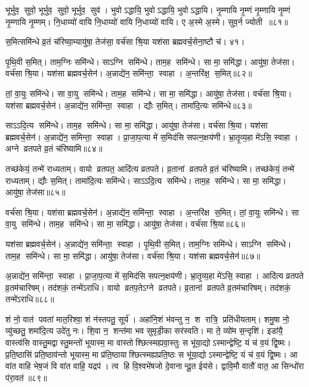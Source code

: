 भूर्भुव॒ सुवो॒ भूर्भुव॒ सुवो॒ भूर्भुव॒ सुव॑। भुवोऽद्धायि॒ भुवोऽद्धायि॒ भुवोऽद्धायि। नृ॒म्णायि नृ॒म्णं नृ॒म्णायि नृ॒म्णं नृ॒म्णायि नृ॒म्णम्। नि॒धाय्यो॑ वायि नि॒धाय्यो॑ वायि नि॒धाय्यो॑ वायि। ए अ॒स्मे अ॒स्मे। सुव॒र्न ज्योती॥८१॥

स॒मित्समि॑न्धे व्र॒तं च॑रिष्या॒म्यायु॑षा॒ तेज॑सा॒ वर्च॑सा श्रि॒या यश॑सा ब्रह्मवर्च॒सेना॒ष्टौ च॑। ४१।
\anuvakamend


पृ॒थि॒वी स॒मित्। ताम॒ग्निः समि॑न्धे। साऽग्नि समि॑न्धे। ताम॒ह समि॑न्धे। सा मा॒ समि॑द्धा। आयु॑षा॒ तेज॑सा। वर्च॑सा श्रि॒या। यश॑सा ब्रह्मवर्च॒सेन॑। अ॒न्नाद्ये॑न॒ समि॑न्ता॒ स्वाहा। अ॒न्तरि॑क्ष॒ स॒मित्॥८२॥

तां॒ वा॒युः समि॑न्धे। सा वा॒यु समि॑न्धे। ताम॒ह समि॑न्धे। सा मा॒ समि॑द्धा। आयु॑षा॒ तेज॑सा। वर्च॑सा श्रि॒या। यश॑सा ब्रह्मवर्च॒सेन॑। अ॒न्नाद्ये॑न॒ समि॑न्ता॒ स्वाहा। द्यौः स॒मित्। तामा॑दि॒त्यः समि॑न्धे॥८३॥

साऽऽदि॒त्य समि॑न्धे। ताम॒ह समि॑न्धे। सा मा॒ समि॑द्धा। आयु॑षा॒ तेज॑सा। वर्च॑सा श्रि॒या। यश॑सा ब्रह्मवर्च॒सेन॑। अ॒न्नाद्ये॑न॒ समिन्ता॒ स्वाहा। प्रा॒जा॒प॒त्या मे॑ स॒मिद॑सि सपत्न॒क्षय॑णी। भ्रा॒तृ॒व्य॒हा मे॑ऽसि॒ स्वाहा। अग्ने व्रतपते व्र॒तं च॑रिष्यामि॥८४॥

तच्छ॑केयं॒ तन्मे॑ राध्यताम्। वायो व्रतपत॒ आदि॑त्य व्रतपते। व्र॒तानां व्रतपते व्र॒तं च॑रिष्यामि। तच्छ॑केयं॒ तन्मे॑ राध्यताम्। द्यौः स॒मित्। तामा॑दि॒त्यः समि॑न्धे। साऽऽदि॒त्य समि॑न्धे। ताम॒ह समि॑न्धे। सा मा॒ समि॑द्धा। आयु॑षा॒ तेज॑सा॥८५॥

वर्च॑सा श्रि॒या। यश॑सा ब्रह्मवर्च॒सेन॑। अ॒न्नाद्ये॑न॒ समि॑न्ता॒ स्वाहा। अ॒न्तरि॑क्ष स॒मित्। तां॒ वा॒युः समि॑न्धे। सा वा॒यु समि॑न्धे। ताम॒ह समि॑न्धे। सा मा॒ समि॑द्धा। आयु॑षा॒ तेज॑सा। वर्च॑सा श्रि॒या॥८६॥

यश॑सा ब्रह्मवर्च॒सेन॑। अ॒न्नाद्ये॑न॒ समि॑न्ता॒ स्वाहा। पृ॒थि॒वी स॒मित्। ताम॒ग्निः समि॑न्धे। साऽग्नि समि॑न्धे। ताम॒ह समि॑न्धे। सा मा॒ समि॑द्धा। आयु॑षा॒ तेज॑सा। वर्च॑सा श्रि॒या। यश॑सा ब्रह्मवर्च॒सेन॑॥८७॥

अ॒न्नाद्ये॑न॒ समि॑न्ता॒ स्वाहा। प्रा॒जा॒प॒त्या मे॑ स॒मिद॑सि सपत्न॒क्षय॑णी। भ्रा॒तृ॒व्य॒हा मे॑ऽसि॒ स्वाहा। आदि॑त्य व्रतपते व्र॒तम॑चारिषम्। तद॑शकं॒ तन्मे॑ऽराधि। वायो व्रतप॒तेऽग्ने व्रतपते। व्र॒तानां व्रतपते व्र॒तम॑चारिषम्। तद॑शकं॒ तन्मे॑ऽराधि॥८८॥
\anuvakamend


शं नो॒ वात॑ पवतां मात॒रिश्वा॒ शं न॑स्तपतु॒ सूर्य॑। अहा॑नि॒शं भ॑वन्तु न॒ श रात्रि॒ प्रति॑धीयताम्। शमु॒षा नो॒ व्यु॑च्छतु॒ शमा॑दि॒त्य उदे॑तु नः। शि॒वा न॒ शन्त॑मा भव सुमृडी॒का सर॑स्वति। मा ते॒ व्यो॑म स॒न्दृशि॑। इडा॑यै॒ वास्त्व॑सि वास्तु॒मद्वास्तु॒मन्तो॑ भूयास्म॒ मा वास्तोश्छित्स्मह्यवा॒स्तुः स भू॑या॒द्योऽस्मान्द्वेष्टि॒ यं च॑ व॒यं द्वि॒ष्मः। प्र॒ति॒ष्ठासि॑ प्रति॒ष्ठाव॑न्तो भूयास्म॒ मा प्र॑ति॒ष्ठायाश्छित्स्मह्यप्रति॒ष्ठः स भू॑या॒द्योऽस्मान्द्वेष्टि॒ यं च॑ व॒यं द्वि॒ष्मः। आ वा॑त वाहि भेष॒जं वि वा॑त वाहि॒ यद्रप॑। त्व हि वि॒श्वभे॑षजो दे॒वानान्दू॒त ईय॑से। द्वावि॒मौ वातौ॑ वात॒ आ सिन्धो॑रा प॑रा॒वत॑॥८९॥

